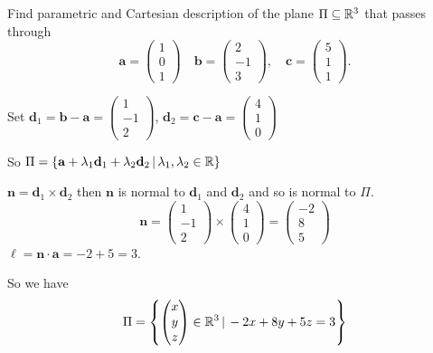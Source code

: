 \documentclass[10pt, a4paper]{article}
\newcommand{\mbf}[1]{\mathbf{#1}}
\begin{document}
\begin{example}
    Find parametric and Cartesian description of the plane $\Pi \subseteq \mathbb{R} ^ 3$ that passes through
    \[
    \mbf{a} = \begin{pmatrix}
        1 \\ 0 \\ 1
    \end{pmatrix}
    \quad
    \mbf{b} = \begin{pmatrix}
        2 \\ -1 \\ 3
    \end{pmatrix},
    \quad
    \mbf{c} = \begin{pmatrix}
        5 \\ 1 \\ 1
    \end{pmatrix}.
    \]

    Set $\mbf{d}_1 = \mbf{b - a} = \begin{pmatrix}
        1 \\ -1 \\ 2
    \end{pmatrix}$, $\mbf{d}_2 = \mbf{c - a} = \begin{pmatrix}
        4 \\ 1 \\ 0
    \end{pmatrix}$

    So $\Pi = \{\mbf{a} + \lambda_1 \mbf{d}_1 + \lambda_2 \mbf{d}_2\,|\, \lambda_1, \lambda_2 \in \R\}$

    $\mbf{n} = \mbf{d}_1 \times \mbf{d}_2$ then $\mbf{n}$ is normal to $\mbf{d}_1$ and $\mbf{d}_2$ and so is normal to $\Pi$.
    \[
    \mbf{n} = \begin{pmatrix}
        1 \\ -1 \\ 2
    \end{pmatrix}
    \times \begin{pmatrix}
        4 \\ 1 \\ 0
    \end{pmatrix}
    =
    \begin{pmatrix}
        -2 \\ 8 \\ 5
    \end{pmatrix}
    \]
    $\ell = \mbf{n \cdot a} = -2 + 5 = 3$.

    So we have
    \[
    \Pi = \left\{\begin{pmatrix}
        x \\ y \\ z
    \end{pmatrix} \in \mathbb{R} ^ 3\,|\, -2x + 8y + 5z = 3\right\}
    \]
\end{example}
\end{document}
